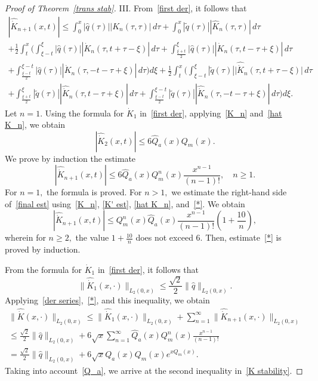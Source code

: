 \documentclass[10pt,a4paper]{amsart}
\begin{document}
\begin{proof}[Proof of Theorem~\ref{trans stab}]
III. From~\eqref{first der}, it follows that
\begin{equation} \label{final est}
\begin{split}
|\hat {\dot K}_{n+1}(x, t)|  \le  \int_0^{x} |\hat q(\tau)| |K_n(\tau, \tau)| \,d\tau 
+ \int_0^{x} |\tilde q(\tau)| |\hat K_n(\tau, \tau)| \,d\tau 
\\
+\frac12\int_t^x \Bigg(\int_{\xi-t}^\xi |\hat q(\tau)||\dot K_n(\tau, t+\tau-\xi)|\,d\tau +
\int_{\frac{\xi+t}{2}}^\xi |\hat q(\tau)||\dot K_n(\tau, t-\tau+\xi)|\,d\tau \\
+\int_{\frac{\xi-t}{2}}^{\xi-t} |\hat q(\tau)||\dot K_n(\tau, -t-\tau+\xi)|\,d\tau\Bigg)d\xi 
+\frac12\int_t^x \Bigg(\int_{\xi-t}^\xi |\tilde q(\tau)|\big|\hat{\dot K}_n(\tau, t+\tau-\xi)\big|\,d\tau \\
+\int_{\frac{\xi+t}{2}}^\xi |\tilde q(\tau)||\hat{\dot K}_n(\tau, t-\tau+\xi)|\,d\tau+\int_{\frac{\xi-t}{2}}^{\xi-t} |\tilde q(\tau)||\hat{\dot K}_n(\tau, -t-\tau+\xi)|\,d\tau\Bigg)d\xi.
\end{split}
\end{equation}
Let $n=1.$
Using the formula for $\dot K_1$ in~\eqref{first der}, applying~\eqref{K_n} and~\eqref{hat K_n}, we obtain
\begin{equation*} \label{base}
|\hat{\dot K}_2(x, t)| \le 6 \hat Q_a(x) Q_{m}(x).
\end{equation*}
We prove by induction the estimate
\begin{equation} \label{*}
|\hat{\dot K}_{n+1}(x, t)| \le 6 \hat{Q}_a(x) Q_{m}^{n}(x) \frac{x^{n-1}}{(n-1)!}, \quad n \ge 1.
\end{equation}
For $n=1,$ the formula is proved. For $n > 1,$ we estimate the right-hand side of~\eqref{final est} using~\eqref{K_n}, \eqref{K' est}, \eqref{hat K_n}, and~\eqref{*}. We obtain
$$ |\hat{\dot K}_{n+1}(x, t)| \le Q_{m}^n(x) \hat{Q}_a(x) \frac{x^{n-1}}{(n-1)!} \left(1 + \frac{10}{n}\right),$$
wherein for $n \ge 2,$ the value $1 + \frac{10}{n}$ does not exceed $6.$ Then, estimate~\eqref{*} is proved by induction. 

From the formula for $\dot{K}_1$ in~\eqref{first der},  it follows that
$$\| \hat {\dot K}_1(x, \cdot)\|_{L_2(0, x)} \le \frac{\sqrt 2}{2}\| \hat q\|_{L_2(0, x)}.$$
Applying~\eqref{der series},~\eqref{*}, and this inequality, we obtain
\begin{equation*}
\begin{split}
\|\hat{\dot K}(x, \cdot)\|_{L_2(0, x)} \le \big\| \hat{\dot K}_1(x, \cdot) \big\|_{L_2(0,x)} + \sum_{n=1}^\infty \big\| \hat{\dot K}_{n+1}(x, \cdot) \big\|_{L_2(0,x)}
\\
\le  \frac{\sqrt2}{2}\| \hat q\|_{L_2(0, x)} + 6\sqrt x \sum_{n=1}^\infty \hat Q_a(x) Q^n_{m}(x) \frac{x^{n-1}}{(n-1)!}\\
= \frac{\sqrt2}{2}\| \hat q\|_{L_2(0, x)} + 6\sqrt xQ_a(x) Q_{m}(x) e^{x Q_m(x)}.
\end{split}
\end{equation*}
Taking into account~\eqref{Q_a}, we arrive at the second inequality in~\eqref{K stability}.
\end{proof}
\end{document}
